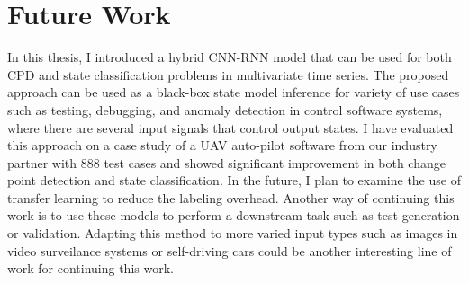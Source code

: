 \chapter{Future Work}\label{sec:future_work}
In this thesis, I introduced a hybrid CNN-RNN model that can be used for both CPD and state classification problems in multivariate time series. The proposed approach can be used as a black-box state model inference for variety of use cases such as testing, debugging, and anomaly detection in control software systems, where there are several input signals that control output states. I have evaluated this approach on a case study of a UAV auto-pilot software from our industry partner with 888 test cases and showed significant improvement in both change point detection and state classification. In the future, I plan to examine the use of transfer learning to reduce the labeling overhead. Another way of continuing this work is to use these models to perform a downstream task such as test generation or validation. Adapting this method to more varied input types such as images in video surveilance systems or self-driving cars could be another interesting line of work for continuing this work.
